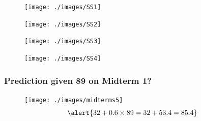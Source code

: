 %
%
\begin{frame}
\begin{figure}
	\texttt{[image: ./images/SS1]}
\end{figure}
\end{frame}
\begin{frame}
\begin{figure}
	\texttt{[image: ./images/SS2]}
\end{figure}
\end{frame}
\begin{frame}
\begin{figure}
	\texttt{[image: ./images/SS3]}
\end{figure}
\end{frame}
\begin{frame}
\begin{figure}
	\texttt{[image: ./images/SS4]}
\end{figure}
\end{frame}
\begin{frame}
\frametitle{Prediction given 89 on Midterm 1? }
\begin{figure}
	\texttt{[image: ./images/midterms5]}
	$$\alert{32 + 0.6 \times 89 = 32 + 53.4 = 85.4}$$
\end{figure}
\end{frame}

